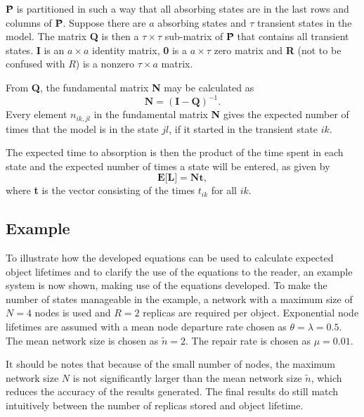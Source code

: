\textbf{\^{P}} is partitioned in such a way that all absorbing states are in the last rows and columns of \textbf{\^{P}}. Suppose there are $a$ absorbing states and $\tau$ transient states in the model. The matrix \textbf{Q} is then a $\tau\times\tau$ sub-matrix of \textbf{\^{P}} that contains all transient states. \textbf{I} is an $a \times a$ identity matrix, \textbf{0} is a $a\times\tau$ zero matrix and \textbf{R} (not to be confused with $R$) is a nonzero $\tau\times a$ matrix.

From \textbf{Q}, the fundamental matrix \textbf{N} may be calculated as \cite{grinstead1997introduction_probability}
%
\begin{equation} \label{eq_fundamental_mat}
    \textbf{N} = (\textbf{I} - \textbf{Q})^{-1}.
\end{equation}
%
Every element $n_{ik,jl}$ in the fundamental matrix \textbf{N} gives the expected number of times that the model is in the state $jl$, if it started in the transient state $ik$.

The expected time to absorption is then the product of the time spent in each state and the expected number of times a state will be entered, as given by
%
\begin{equation} \label{expected_lifetime}
    \textbf{E[L]} = \textbf{Nt},
\end{equation}
%
where \textbf{t} is the vector consisting of the times $t_{ik}$ for all $ik$.

\subsection{Example}

To illustrate how the developed equations can be used to calculate expected object lifetimes and to clarify the use of the equations to the reader, an example system is now shown, making use of the equations developed. To make the number of states manageable in the example, a network with a maximum size of $N=4$ nodes is used and $R=2$ replicas are required per object. Exponential node lifetimes are assumed with a mean node departure rate chosen as $\theta = \lambda = 0.5$. The mean network size is chosen as $\tilde{n} = 2$. The repair rate is chosen as $\mu = 0.01$.

It should be notes that because of the small number of nodes, the maximum network size $N$ is not significantly larger than the mean network size $\tilde{n}$, which reduces the accuracy of the results generated. The final results do still match intuitively between the number of replicas stored and object lifetime.

